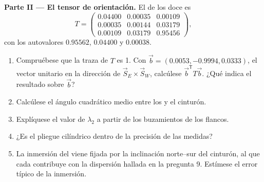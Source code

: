 \begin{problem}
\medskip\noindent\textbf{Parte II --- El tensor de orientación.}
El  de los doce  es
\[
  T = \begin{pmatrix} 0.04400 & 0.00035 & 0.00109\\ 0.00035 & 0.00144 & 0.03179\\
  0.00109 & 0.03179 & 0.95456 \end{pmatrix},
\]
con los autovalores $0.95562$, $0.04400$ y $0.00038$.
\begin{enumerate}[resume]
  \item Compruébese que la traza de $T$ es 1. Con $\vec b = (0.0053, -0.9994,
        0.0333)$, el vector unitario en la dirección de $\vec S_E\times\vec S_W$, calcúlese
        $\vec b^{\mathsf T}T\vec b$. ¿Qué indica el resultado sobre $\vec b$?
  \item Calcúlese el ángulo cuadrático medio entre los  y el cinturón.
  \item Explíquese el valor de $\lambda_2$ a partir de los buzamientos de los flancos.
  \item ¿Es el pliegue cilíndrico dentro de la precisión de las medidas?
  \item La inmersión del  viene fijada por la inclinación norte--sur del
        cinturón, al que cada  contribuye con la dispersión hallada en
        la pregunta 9. Estímese el error típico de la inmersión.
\end{enumerate}


\end{problem}
